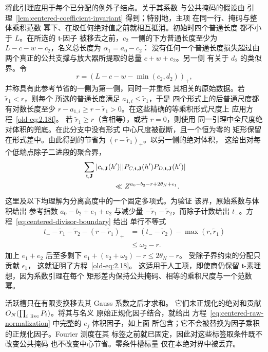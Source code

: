 \documentclass[11pt,a4paper]{article}
\numberwithin{equation}{section}
\numberwithin{figure}{section}
\theoremstyle{definition}
\theoremstyle{remark}
\begin{document}
将此引理应用于每个已分配的例外子结点。关于其系数
与公共掩码的假设由
引理~\ref{lem:centered-coefficient-invariant} 得到；特别地，主项
在同一行、掩码与整体乘积范数
幂下、在取任何绝对值之前就相互抵消。初始时四个普通长度
都不小于 \(L\)。在所选的 \(\mathfrak t\)-因子
被移去之前，\(c_2\) 一侧的下方普通长度至少为
\(L-c-w-c_2\)，名义总长度为 \(\alpha_1=a_0-c_2\)：
没有任何一个普通长度损失超过由
两个真正的公共支撑与放大器所提取的总量 \(c+w+c_2\)。另一侧
有关于 \(d_2\) 的类似界。令
\[
 r=(L-c-w-\min(c_2,d_2))_+,
\]
并称具有此参考节省的一侧为第一侧，同时一并重标
其相关的原始数据。若 \(\widetilde r_1<r\)，则每个
所选的普通长度满足 \(a_{1,i}\le\widetilde r_1\)，于是
四个形式上的后普通尺度都有对数长度至少
\(r-a_{1,i}\ge r-\widetilde r_1>0\)。在这些精确的等乘积形式尺度上
应用方程~\eqref{old-eq:2.18f}。
若 \(\widetilde r_1\ge r\)（含相等），或若 \(r=0\)，则使用
同一引理中全尺度绝对体积的兜底。在此分支中没有形式
中心尺度被截断，且一个恒为零的
矩形保留在形式差中。由此得到的节省为
\((r-\widetilde r_1)_+\)。以另一侧的绝对体积，
这给出对每个低端点除子二进段的聚合界，
\begin{equation}
 \begin{split}
 &\sum_{\mathfrak t,\mathbf J}
 |c_{\mathfrak t,\mathbf J}(h')|
 |P_{C,\mathfrak t,\mathbf J}(h')
       P_{D,\mathfrak t,\mathbf J}(h')|\\
 &\hspace{15mm}\ll
 Z^{a_0-b_2-r+2\theta_N+\epsilon_1}.
 \end{split}
 \label{old-eq:2.18}
\end{equation}
这里及以下均理解为分离高度中的一个固定多项式。为验证
该界，原始系数与体积给出
参考指数 \(a_0-b_2+e_1+e_2\) 与减少量
\(-\widetilde r_1-\widetilde r_2\)，而除子计数给出
\(t_-\)。方程~\eqref{eq:centered-divisor-boundary} 给出
单行不等式
\begin{equation}
 \begin{split}
 t_- -\widetilde r_1-\widetilde r_2-(r-\widetilde r_1)_+
 &=(t_- -\widetilde r_2)-\max(r,\widetilde r_1)\\
 &\le\omega_2-r.
 \end{split}
 \label{old-eq:2.18h}
\end{equation}
加上 \(e_1+e_2\) 后至多剩下
\(e_1+(e_2+\omega_2)-r\le2\theta_N-r\)。
受除子界约束的分配只贡献 \(\epsilon_1\)，
这就证明了方程~\eqref{old-eq:2.18}。
这适用于人工项，即使商仍保留
\(\mathfrak t\)-素理想，因为系数引理在每个
矩形差内保持公共掩码、相等的乘积尺度与一个范数幂。

活跃槽只在有限变换移去其 Gauss 系数之后才求和。
它们未正规化的绝对和贡献
\(O_N(\prod_{i\ {\rm live}}P_i)\)。将其与名义
原始正规化因子结合，就给出
方程~\eqref{eq:centered-raw-normalization} 中完整的 \(e_j\) 体积因子，如上面
所包含；它不会被替换为因子乘积的正规化因子。Fourier 测度在其
标签之前就已固定，因此对这些标签取条件既不改变公共掩码
也不改变中心节省。零条件槽标量
仅在本绝对界中被丢弃。
\end{document}
